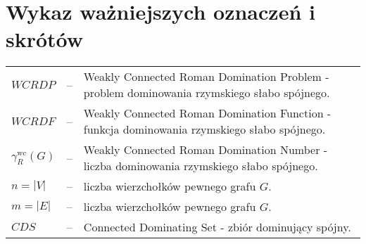 \chapter*{Wykaz ważniejszych oznaczeń i skrótów}

\begin{tabular}{@{} l l p{} @{}}
    $WCRDP$ & -- & Weakly Connected Roman Domination Problem - problem dominowania rzymskiego słabo spójnego.\\
    $WCRDF$ & -- & Weakly Connected Roman Domination Function - funkcja dominowania rzymskiego słabo spójnego. \\
    $\gamma_{R}^{\text{wc}}(G)$ & -- & Weakly Connected Roman Domination Number - liczba dominowania rzymskiego słabo spójnego. \\
    $n = |V|$ & -- & liczba wierzchołków pewnego grafu $G$.\\
    $m = |E|$ & -- & liczba wierzchołków pewnego grafu $G$.\\
    $CDS$ & -- & Connected Dominating Set - zbiór dominujący spójny.\\
\end{tabular}
